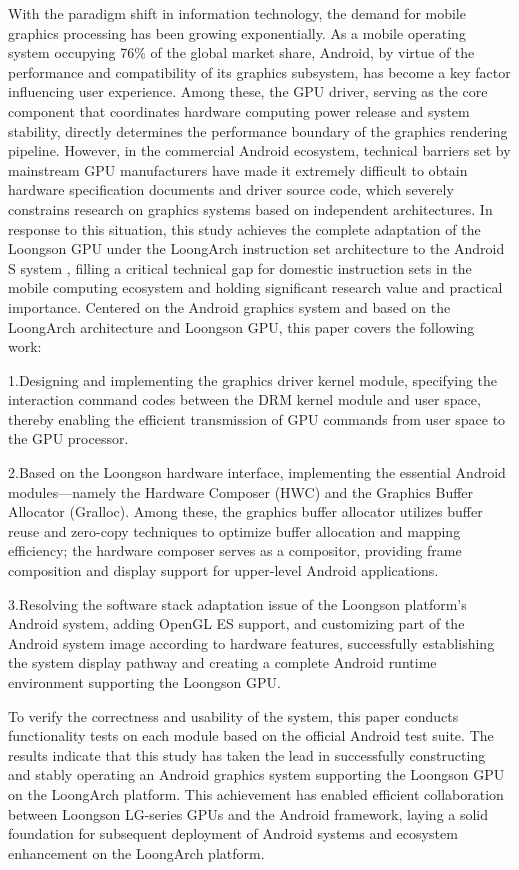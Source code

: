 \begin{abstract*}
  With the paradigm shift in information technology, the demand for mobile graphics processing has been growing exponentially. 
  As a mobile operating system occupying 76\% of the global market share,
  Android, by virtue of the performance and compatibility of its graphics subsystem, 
  has become a key factor influencing user experience. Among these, the GPU driver, 
  serving as the core component that coordinates hardware computing power release and system stability,
  directly determines the performance boundary of the graphics rendering pipeline. 
  However, in the commercial Android ecosystem, technical barriers set by mainstream GPU manufacturers 
  have made it extremely difficult to obtain hardware specification documents and driver source code,
  which severely constrains research on graphics systems based on independent architectures. 
  In response to this situation, this study achieves the complete adaptation of the Loongson GPU under 
  the LoongArch instruction set architecture to the Android S system
  , filling a critical technical gap for domestic instruction sets in the mobile computing ecosystem and 
  holding significant research value and practical importance. Centered on the Android graphics system and 
  based on the LoongArch architecture and Loongson GPU, this paper covers the following work:
  
  1.Designing and implementing the graphics driver kernel module, specifying the interaction command codes between 
  the DRM kernel module and user space, thereby enabling the efficient transmission of GPU commands from 
  user space to the GPU processor.
  
  2.Based on the Loongson hardware interface, implementing the essential Android modules—namely the Hardware Composer (HWC) and the Graphics Buffer Allocator (Gralloc).
  Among these, the graphics buffer allocator utilizes buffer reuse and zero-copy techniques to optimize buffer allocation and mapping efficiency;
  the hardware composer serves as a compositor, providing frame composition and display support for upper-level Android applications.
  
  3.Resolving the software stack adaptation issue of the Loongson platform’s Android system, adding OpenGL ES support, and customizing part of the Android system image according to hardware features,
  successfully establishing the system display pathway and creating a complete Android runtime environment supporting the Loongson GPU.
  
  To verify the correctness and usability of the system, this paper conducts functionality tests on each module based on the official Android test suite.
  The results indicate that this study has taken the lead in successfully constructing and stably operating an Android graphics system supporting the Loongson GPU on the LoongArch platform.
  This achievement has enabled efficient collaboration between Loongson LG-series GPUs and the Android framework, laying a solid foundation for subsequent deployment of Android systems and ecosystem enhancement on the LoongArch platform.
  
\end{abstract*}
